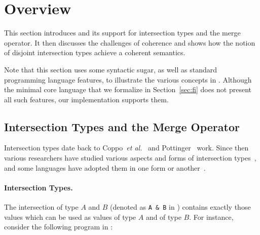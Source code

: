 \section{Overview} \label{sec:overview}

This section introduces \name and its support for intersection types and the
merge operator. It then discusses the challenges of coherence and shows how the
notion of disjoint intersection types achieve a coherent semantics.

Note that this section uses some syntactic sugar, as well as standard
programming language features, to illustrate the various concepts in
\name. Although the minimal core language that we formalize in
Section~\ref{sec:fi} does not present all such features, our implementation
supports them.

\subsection{Intersection Types and the Merge Operator}

Intersection types date back to Coppo~\textit{et
  al.}~\cite{coppo1981functional} and Pottinger~\cite{Pottinger80type}
work. Since then various researchers have
studied various aspects and forms of intersection
types~\cite{Freeman91refinement,pierce1991programming1,Castagna92calculus,pierce1997intersection,davies2000intersection,Dunfield03Intersections},
and some languages have adopted them in one form or
another~\cite{reynolds1997design,Benzaken03cduce,scala-overview,Dunfield07:Stardust}.


\paragraph{Intersection Types.}
The intersection of type $A$ and $B$ (denoted as \lstinline{A & B} in
\name) contains exactly those values
which can be used as values of type $A$ and of type $B$. For instance,
consider the following program in \name:

